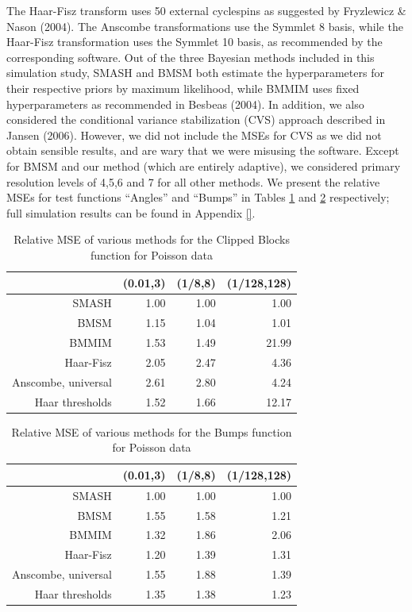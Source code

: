 \documentclass[12pt]{article}
\begin{document}
The Haar-Fisz transform uses 50 external cyclespins as suggested by Fryzlewicz \& Nason (2004). The Anscombe transformations use the Symmlet 8 basis, while the Haar-Fisz transformation uses the Symmlet 10 basis, as recommended by the corresponding software. Out of the three Bayesian methods included in this simulation study, SMASH and BMSM both estimate the hyperparameters for their respective priors by maximum likelihood, while BMMIM uses fixed hyperparameters as recommended in Besbeas (2004). In addition, we also considered the conditional variance stabilization (CVS) approach described in Jansen (2006). However, we did not include the MSEs for CVS as we did not obtain sensible results, and are wary that we were misusing the software.  Except for BMSM and our method (which are entirely adaptive), we considered primary resolution levels of 4,5,6 and 7 for all other methods. We present the relative MSEs for test functions ``Angles'' and ``Bumps'' in Tables \ref{table:pois_angles} and \ref{table:pois_bumps} respectively; full simulation results can be found in Appendix \ref{}.\bigskip\\
\begin{table}[ht]
\centering
\begin{tabular}{rrrr}
  \hline
 & (0.01,3) & (1/8,8) & (1/128,128) \\
  \hline
SMASH & 1.00 & 1.00 & 1.00 \\
  BMSM & 1.15 & 1.04 & 1.01 \\
  BMMIM & 1.53 & 1.49 & 21.99 \\
  Haar-Fisz & 2.05 & 2.47 & 4.36 \\
  Anscombe, universal & 2.61 & 2.80 & 4.24 \\
  Haar thresholds & 1.52 & 1.66 & 12.17 \\
   \hline
\end{tabular}
\caption{Relative MSE of various methods for the Clipped Blocks function for Poisson data}
\label{table:pois_angles}
\end{table}

\begin{table}[ht]
\centering
\begin{tabular}{rrrr}
  \hline
 & (0.01,3) & (1/8,8) & (1/128,128) \\
  \hline
SMASH & 1.00 & 1.00 & 1.00 \\
  BMSM & 1.55 & 1.58 & 1.21 \\
  BMMIM & 1.32 & 1.86 & 2.06 \\
  Haar-Fisz & 1.20 & 1.39 & 1.31 \\
  Anscombe, universal & 1.55 & 1.88 & 1.39 \\
  Haar thresholds & 1.35 & 1.38 & 1.23 \\
   \hline
\end{tabular}
\caption{Relative MSE of various methods for the Bumps function for Poisson data}
\label{table:pois_bumps}
\end{table}
\end{document}
